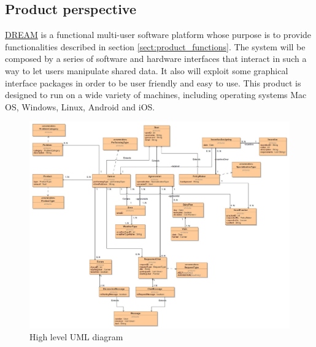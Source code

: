 
\subsection{Product perspective}
\hyperref[tab:acronymsTable]{DREAM} is a functional multi-user software platform whose purpose is to provide functionalities described in section \ref{sect:product_functions}. The system will be composed by a series of software and hardware interfaces that interact in such a way to let users manipulate shared data. It also will exploit some graphical interface packages in order to be user friendly and easy to use.
This product is designed to run on a wide variety of machines, including operating systems Mac OS, Windows, Linux, Android and iOS. 

\begin{figure}[H]
	\centering
    \includegraphics[page=1, width=\textwidth]{Images/uml.JPG}
	\caption{\label{fig:uml_class_diagram}High level UML diagram}
\end{figure}


